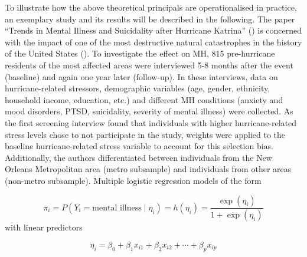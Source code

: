 \documentclass[
]{krantz}
\begin{document}
To illustrate how the above theoretical principals are operationalised in practice, an exemplary study and its results will be described in the following. The paper ``Trends in Mental Illness and Suicidality after Hurricane Katrina'' (\citet{kessler2008}) is concerned with the impact of one of the most destructive natural catastrophes in the history of the United States (\citet{graumann2006}). To investigate the effect on MH, 815 pre-hurricane residents of the most affected areas were interviewed 5-8 months after the event (baseline) and again one year later (follow-up). In these interviews, data on hurricane-related stressors, demographic variables (age, gender, ethnicity, household income, education, etc.) and different MH conditions (anxiety and mood disorders, PTSD, suicidality, severity of mental illness) were collected. As the first screening interview found that individuals with higher hurricane-related stress levels chose to not participate in the study, weights were applied to the baseline hurricane-related stress variable to account for this selection bias. Additionally, the authors differentiated between individuals from the New Orleans Metropolitan area (metro subsample) and individuals from other areas (non-metro subsample). Multiple logistic regression models of the form

\[
\pi_i = P(Y_i = \text{mental illness} \mid \eta_i) = h(\eta_i) = \frac{\exp(\eta_i)}{1 + \exp(\eta_i)}
\]
with linear predictors

\[
\eta_i = \beta_0 + \beta_1 x_{i1} + \beta_2 x_{i2} + \cdots + \beta_p x_{ip}
\]
\end{document}
